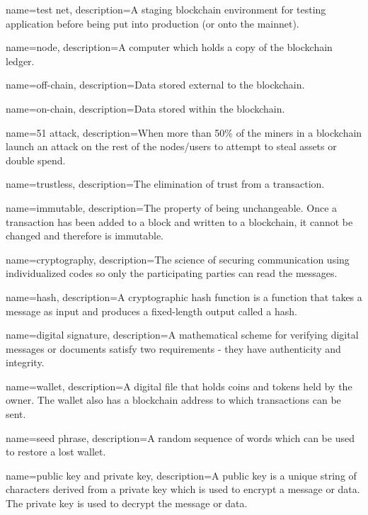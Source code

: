  {
	name=test net,
	description={A staging blockchain environment for testing application before being put into production (or onto the mainnet).}
}

 {
	name=node,
	description={A computer which holds a copy of the blockchain ledger.}
}

 {
	name=off-chain,
	description={Data stored external to the blockchain.}
}

 {
	name=on-chain,
	description={Data stored within the blockchain.}
}


 {
	name=51 attack,
	description={When more than 50\% of the miners in a blockchain launch an attack on the rest of the nodes/users to attempt to steal assets or double spend.}
}

 {
	name=trustless,
	description={The elimination of trust from a transaction.}
}

 {
	name=immutable,
	description={The property of being unchangeable. Once a transaction has been added to a block and written to a blockchain, it cannot be changed and therefore is immutable.}
}

 {
	name=cryptography,
	description={The science of securing communication using individualized codes so only the participating parties can read the messages.}
}

 {
	name=hash,
	description={A cryptographic hash function is a function that takes a message as input and produces a fixed-length output called a hash.}
}

 {
	name=digital signature,
	description={A mathematical scheme for verifying digital messages or documents satisfy two requirements - they have authenticity and integrity.}
}

 {
	name=wallet,
	description={A digital file that holds coins and tokens held by the owner. The wallet also has a blockchain address to which transactions can be sent.}
}

 {
	name=seed phrase,
	description={A random sequence of words which can be used to restore a lost wallet.}
}

 {
	name=public key and private key,
	description={A public key is a unique string of characters derived from a private key which is used to encrypt a message or data. The private key is used to decrypt the message or data.}
}


